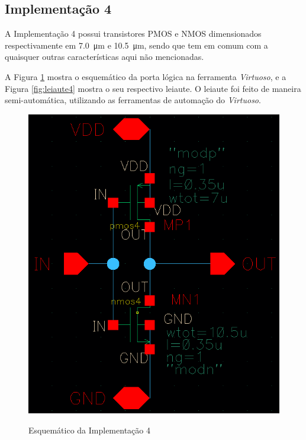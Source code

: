 \documentclass{iiufrgs}
\newcommand{\virtuoso}{\textit{Virtuoso}}
\begin{document}
\FloatBarrier

\subsection{Implementação 4}\label{impl4}
A Implementação 4 possui transistores PMOS e NMOS dimensionados respectivamente em \SI{7.0}{\um} e \SI{10.5}{\um}, sendo que tem em comum com a  quaisquer outras características aqui não mencionadas.\

A Figura \ref{fig:esquematico4} mostra o esquemático da porta lógica na ferramenta \virtuoso, e a Figura \ref{fig:leiaute4} mostra o seu respectivo leiaute. O leiaute foi feito de maneira semi-automática, utilizando as ferramentas de automação do \virtuoso.

\begin{figure}[htbp]
    \centering
    \caption{Esquemático da Implementação 4}
    \includegraphics[scale=0.8]{images/esquematico4.png}
    \label{fig:esquematico4}
\end{figure}
\end{document}
